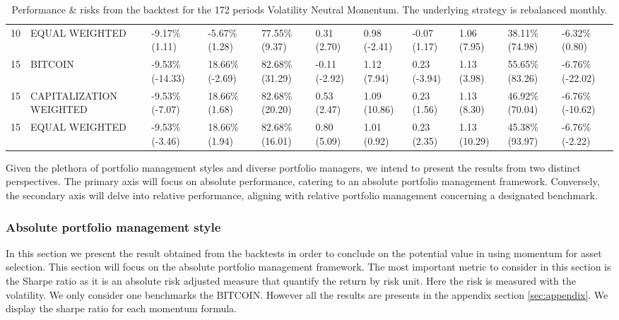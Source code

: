 \documentclass{article}
\begin{document}
\begin{landscape}
\begin{table}[H]
\begin{tabular}{p{0.4cm}|p{3cm}|p{1.65cm}|p{1.65cm}|p{1.65cm}|p{1.65cm}|p{1.65cm}|p{1.65cm}|p{1.65cm}|p{1.65cm}|p{1.65cm}}
\\ 
10&EQUAL WEIGHTED&-9.17\% (1.11)&-5.67\% (1.28)&77.55\% (9.37)&0.31 (2.70)&0.98 (-2.41)&-0.07 (1.17)&1.06 (7.95)&38.11\% (74.98)&-6.32\% (0.80)
\\ 
15&BITCOIN&-9.53\% (-14.33)&18.66\% (-2.69)&82.68\% (31.29)&-0.11 (-2.92)&1.12 (7.94)&0.23 (-3.94)&1.13 (3.98)&55.65\% (83.26)&-6.76\% (-22.02)
\\ 
15&CAPITALIZATION WEIGHTED&-9.53\% (-7.07)&18.66\% (1.68)&82.68\% (20.20)&0.53 (2.47)&1.09 (10.86)&0.23 (1.56)&1.13 (8.30)&46.92\% (70.04)&-6.76\% (-10.62)
\\ 
15&EQUAL WEIGHTED&-9.53\% (-3.46)&18.66\% (1.94)&82.68\% (16.01)&0.80 (5.09)&1.01 (0.92)&0.23 (2.35)&1.13 (10.29)&45.38\% (93.97)&-6.76\% (-2.22)\\
    \bottomrule
  \end{tabular}
  \label{tab:volneutmom172meanvar}
   \caption{Performance \& risks from the backtest for the 172 periods Volatility Neutral Momentum. The underlying strategy is rebalanced monthly.}
\end{table}
\end{landscape}
Given the plethora of portfolio management styles and diverse portfolio managers, we intend to present the results from two distinct perspectives. The primary axis will focus on absolute performance, catering to an absolute portfolio management framework. Conversely, the secondary axis will delve into relative performance, aligning with relative portfolio management concerning a designated benchmark.

\subsubsection{Absolute portfolio management style}\label{subsubsec:absPtfMngt}
In this section we present the result obtained from the backtests in order to conclude on the potential value in using momentum for asset selection. This section will focus on the absolute portfolio management framework. The most important metric to consider in this section is the Sharpe ratio as it is an absolute risk adjusted measure that quantify the return by risk unit. Here the risk is measured with the volatility. We only consider one benchmarks the BITCOIN. However all the results are presents in the appendix section \ref{sec:appendix}. We display the sharpe ratio for each momentum formula.
\end{document}
